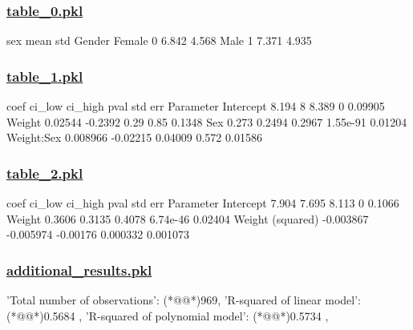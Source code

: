 \documentclass[11pt]{article}
\begin{document}
\subsubsection*{\hyperlink{code-Data Analysis-table-0-pkl}{table\_0.pkl}}

\begin{codeoutput}
        sex  mean   std
Gender                 
Female    0 6.842 4.568
Male      1 7.371 4.935
\end{codeoutput}\hypertarget{file-table-1-pkl}{}

\subsubsection*{\hyperlink{code-Data Analysis-table-1-pkl}{table\_1.pkl}}

\begin{codeoutput}
               coef   ci\_low  ci\_high      pval  std err
Parameter                                               
Intercept     8.194        8    8.389         0  0.09905
Weight      0.02544  -0.2392     0.29      0.85   0.1348
Sex           0.273   0.2494   0.2967  1.55e-91  0.01204
Weight:Sex 0.008966 -0.02215  0.04009     0.572  0.01586
\end{codeoutput}\hypertarget{file-table-2-pkl}{}

\subsubsection*{\hyperlink{code-Data Analysis-table-2-pkl}{table\_2.pkl}}

\begin{codeoutput}
                      coef    ci\_low  ci\_high      pval  std err
Parameter                                                       
Intercept            7.904     7.695    8.113         0   0.1066
Weight              0.3606    0.3135   0.4078  6.74e-46  0.02404
Weight (squared) -0.003867 -0.005974 -0.00176  0.000332 0.001073
\end{codeoutput}\hypertarget{file-additional-results-pkl}{}

\subsubsection*{\hyperlink{code-Data Analysis-additional-results-pkl}{additional\_results.pkl}}

\begin{codeoutput}
{
    'Total number of observations': (*@@*)969,
    'R-squared of linear model': (*@@*)0.5684           ,
    'R-squared of polynomial model': (*@@*)0.5734            ,
}
\end{codeoutput}
\end{document}
